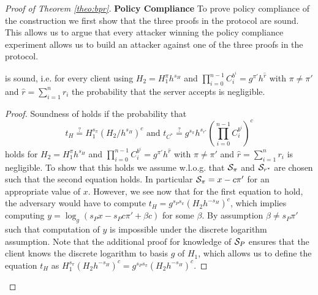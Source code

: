 \begin{proof}[Proof of Theorem \ref{theo:bpr}]
\textbf{Policy Compliance}
To prove policy compliance of the construction we first show that the three proofs in the protocol are sound.
This allows us to argue that every attacker winning the policy compliance experiment allows us to build an attacker against one of the three proofs in the protocol.

\begin{claim}
  \PoE is sound, i.e. for every client using $H_2=H_1^{\pi}h^{s_H}$ and $\prod_{i=0}^{n-1} C^{b^i}_i=g^{\pi'}h^{\hat{r}}$ with $\pi\not=\pi'$ and $\hat{r}=\sum_{i=1}^n r_i$ the probability that the server accepts \PoE is negligible.
\end{claim}

\begin{proof}
Soundness of \PoE holds if the probability that
\[ t_H\stackrel{?}{=} H_1^{s_\pi}(H_2/h^{s_H})^c \text{ and } t_{C^\ast} \stackrel{?}{=} g^{s_\pi}h^{s_{r^\ast}}\left(\prod_{i=0}^{n-1} C^{b^i}_i \right)^c \]
holds for $H_2=H_1^{\pi}h^{s_H}$ and $\prod_{i=0}^{n-1} C^{b^i}_i=g^{\pi'}h^{\hat{r}}$ with $\pi\not=\pi'$ and $\hat{r}=\sum_{i=1}^n r_i$ is negligible.
To show that this holds we assume w.l.o.g. that $\mathcal{S}_\pi$ and $\mathcal{S}_{r^\ast}$ are chosen such that the second equation holds.
In particular $\mathcal{S}_\pi=x-c\pi'$ for an appropriate value of $x$.
However, we see now that for the first equation to hold, the adversary would have to compute $t_H=g^{s_P s_\pi}(H_2h^{-s_H})^c$, which implies computing $y=\log_g(s_P x-s_P c\pi'+\beta c)$ for some $\beta$.
By assumption $\beta\not= s_P\pi'$ such that computation of $y$ is impossible under the discrete logarithm assumption.
Note that the additional proof for knowledge of $\mathcal{S}_P$ ensures that the client knows the discrete logarithm to basis $g$ of $H_1$, which allows us to define the equation $t_H$ as $H_1^{s_\pi}(H_2h^{-s_H})^c=g^{s_P s_\pi}(H_2h^{-s_H})^c$.

\end{proof}


\end{proof}
